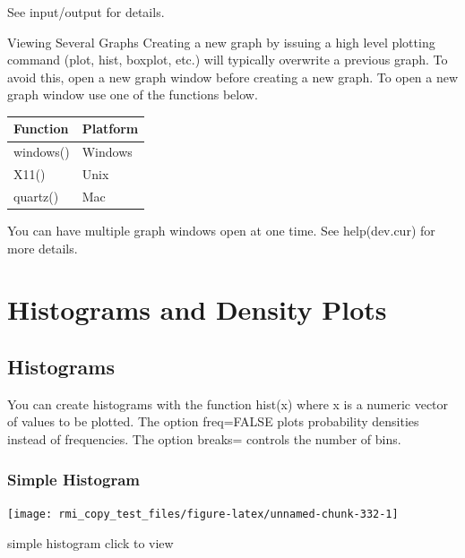 \documentclass[]{book}
\newenvironment{Shaded}{\begin{snugshade}}{\end{snugshade}}
\newcommand{\KeywordTok}[1]{\textcolor[rgb]{0.13,0.29,0.53}{\textbf{#1}}}
\newcommand{\NormalTok}[1]{#1}
\newcommand{\OperatorTok}[1]{\textcolor[rgb]{0.81,0.36,0.00}{\textbf{#1}}}
\theoremstyle{definition}
\theoremstyle{definition}
\theoremstyle{definition}
\theoremstyle{remark}
\begin{document}
See input/output for details.

Viewing Several Graphs Creating a new graph by issuing a high level
plotting command (plot, hist, boxplot, etc.) will typically overwrite a
previous graph. To avoid this, open a new graph window before creating a
new graph. To open a new graph window use one of the functions below.

\begin{longtable}[]{@{}ll@{}}
\toprule
Function & Platform\tabularnewline
\midrule
\endhead
windows() & Windows\tabularnewline
X11() & Unix\tabularnewline
quartz() & Mac\tabularnewline
\bottomrule
\end{longtable}

You can have multiple graph windows open at one time. See help(dev.cur)
for more details.

\hypertarget{histograms-and-density-plots}{%
\section{Histograms and Density
Plots}\label{histograms-and-density-plots}}

\hypertarget{histograms}{%
\subsection{Histograms}\label{histograms}}

You can create histograms with the function hist(x) where x is a numeric
vector of values to be plotted. The option freq=FALSE plots probability
densities instead of frequencies. The option breaks= controls the number
of bins.

\hypertarget{simple-histogram}{%
\subsubsection{Simple Histogram}\label{simple-histogram}}

\begin{Shaded}
\end{Shaded}

\begin{center}\texttt{[image: rmi\_copy\_test\_files/figure-latex/unnamed-chunk-332-1]} \end{center}

simple histogram click to view
\end{document}
